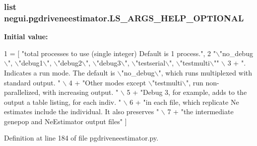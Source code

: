 \subsubsection[{\texorpdfstring{L\+S\+\_\+\+A\+R\+G\+S\+\_\+\+H\+E\+L\+P\+\_\+\+O\+P\+T\+I\+O\+N\+AL}{LS_ARGS_HELP_OPTIONAL}}]{\setlength{\rightskip}{0pt plus 5cm}list negui.\+pgdriveneestimator.\+L\+S\+\_\+\+A\+R\+G\+S\+\_\+\+H\+E\+L\+P\+\_\+\+O\+P\+T\+I\+O\+N\+AL}\hypertarget{namespacenegui_1_1pgdriveneestimator_aee59027c12769e0749f07a70867259b4}{}\label{namespacenegui_1_1pgdriveneestimator_aee59027c12769e0749f07a70867259b4}
{\bfseries Initial value\+:}
\begin{DoxyCode}
1 = [  \textcolor{stringliteral}{"total processes to use (single integer) Default is 1 process."},
2                 \textcolor{stringliteral}{"\(\backslash\)"no\_debug\(\backslash\)", \(\backslash\)"debug1\(\backslash\)", \(\backslash\)"debug2\(\backslash\)", \(\backslash\)"debug3\(\backslash\)", \(\backslash\)"testserial\(\backslash\)", \(\backslash\)"testmulti\(\backslash\)""} \(\backslash\)
3                 + \textcolor{stringliteral}{".  Indicates a run mode. The default is \(\backslash\)"no\_debug\(\backslash\)", which runs multiplexed with
       standard output.  "} \(\backslash\)
4                 + \textcolor{stringliteral}{"Other modes except \(\backslash\)"testmulti\(\backslash\)", run non-parallelized, with increasing output.  "} \(\backslash\)
5                 + \textcolor{stringliteral}{"Debug 3, for example, adds to the output a table listing, for each indiv. "} \(\backslash\)
6                 + \textcolor{stringliteral}{"in each file, which replicate Ne estimates include the individual.  It also preserves "} 
      \(\backslash\)
7                 + \textcolor{stringliteral}{"the intermediate genepop and NeEstimator output files"} ]
\end{DoxyCode}


Definition at line 184 of file pgdriveneestimator.\+py.

